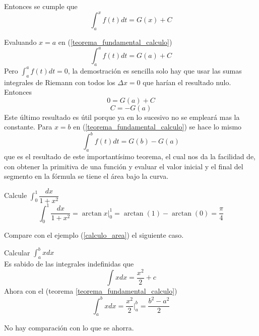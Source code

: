 \documentclass[10pt,twoside]{SelfArx} %
\begin{document}
Entonces se cumple que
\begin{equation}
	\int_{a}^{x}f(t)dt=G(x)+C\label{teorema_fundamental_calculo}
\end{equation}

 Evaluando $ x=a $ en (\ref{teorema_fundamental_calculo})%
\begin{equation}
	\int_{a}^{a}f(t)dt=G(a)+C
\end{equation}
 Pero $ \displaystyle\int_{a}^{a}f(t)dt=0 $, la demostración es sencilla solo hay que usar las sumas integrales de Riemann con todos los $ \Delta x=0 $ que harían el resultado nulo.\\
 Entonces
 \begin{equation}
0=G(a)+C
 \end{equation}
 \begin{equation}
C=-G(a)
 \end{equation}
 Este último resultado es útil porque ya en lo sucesivo no se empleará mas la constante. Para $ x=b $ en (\ref{teorema_fundamental_calculo}) se hace lo mismo 
 \begin{equation}
 	\int_{a}^{b}f(t)dt=G(b)-G(a)
 \end{equation}
 que es el resultado de este importantísimo teorema, el cual nos da la facilidad de, con obtener la primitiva de una función y evaluar el valor inicial y el final del segmento en la fórmula se tiene el área bajo la curva.
 
\begin{ejemplo}
	Calcule $ \displaystyle\int_{0}^{1}\dfrac{dx}{1+x^{2}} $
	\begin{equation}
	\int_{0}^{1}\dfrac{dx}{1+x^{2}}=\arctan x\bigg|_{0}^{1}=\arctan(1)-\arctan(0)=\dfrac{\pi}{4}
	\end{equation}
\end{ejemplo} 
Compare  con el ejemplo (\ref{calculo_area}) el siguiente caso.
\begin{ejemplo}
	Calcular $ \displaystyle\int_{a}^{b}xdx  $\\
	Es sabido de las integrales indefinidas que
	\[ \int xdx=\dfrac{x^{2}}{2}+c \]
	Ahora con el (teorema \ref{teorema_fundamental_calculo})
\begin{equation}
	\int_{a}^{b}xdx=\dfrac{x^{2}}{2}\bigg|_{a}^{b}=\dfrac{b^{2}-a^{2}}{2}
\end{equation}
\end{ejemplo}
No hay comparación con lo que se ahorra.
\end{document}
